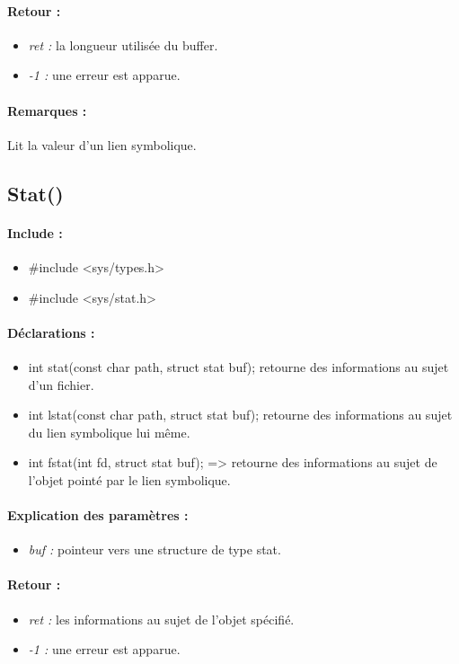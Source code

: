 \documentclass{article}[12pt]
\begin{document}
\paragraph{Retour : }
\begin{itemize}
	\item \emph{ret : } la longueur utilisée du buffer. 
	\item \emph{-1 : } une erreur est apparue.
\end{itemize}
\paragraph{Remarques : }
Lit la valeur d'un lien symbolique.
\subsection{Stat()}
\paragraph{Include : }
\begin{itemize}
	\item \#include <sys/types.h>
	\item \#include <sys/stat.h>
\end{itemize}
\paragraph{Déclarations : }
\begin{itemize}
	\item int stat(const char \* path, struct stat \* buf); retourne des informations au sujet d'un fichier.
	\item int lstat(const char \* path, struct stat \* buf); retourne des informations au sujet du lien symbolique lui même.
	\item int fstat(int fd, struct stat \* buf); => retourne des informations au sujet de l'objet pointé par le lien symbolique. 
\end{itemize}
\paragraph{Explication des paramètres : }
\begin{itemize}
	\item \emph{buf : } pointeur vers une structure de type stat.
\end{itemize}
\paragraph{Retour : }
\begin{itemize}
	\item \emph{ret : } les informations au sujet de l'objet spécifié. 
	\item \emph{-1 : } une erreur est apparue.
\end{itemize}
\end{document}
